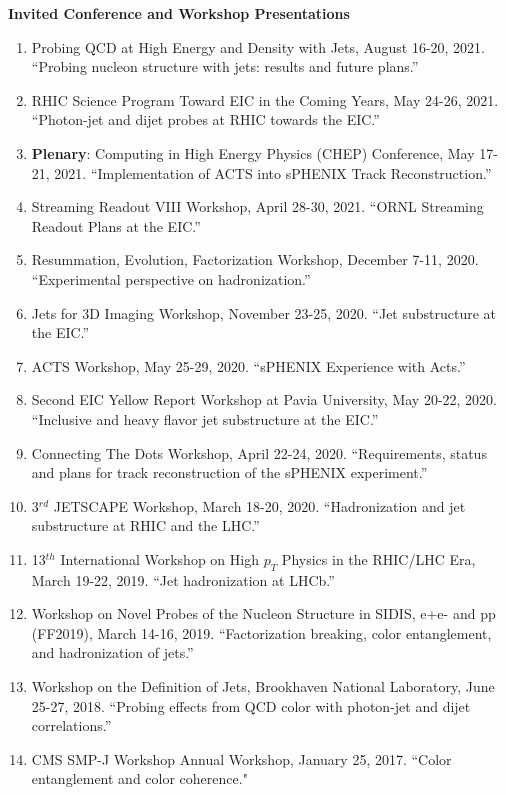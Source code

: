 \documentclass[11pt]{article}
\begin{document}
\vspace{7pt}

\begin{flushleft}
	\LARGE\textbf{Invited Conference and Workshop Presentations}
	\normalsize
	\begin{enumerate}
		\item Probing QCD at High Energy and Density with Jets, August 16-20, 2021. ``Probing nucleon structure with jets: results and future plans.''
		\item RHIC Science Program Toward EIC in the Coming Years, May 24-26, 2021. ``Photon-jet and dijet probes at RHIC towards the EIC.''
		\item {\bf{Plenary}}: Computing in High Energy Physics (CHEP) Conference, May 17-21, 2021. ``Implementation of ACTS into sPHENIX Track Reconstruction.''
		\item Streaming Readout VIII Workshop, April 28-30, 2021. ``ORNL Streaming Readout Plans at the EIC.''\\
		\item Resummation, Evolution, Factorization Workshop, December 7-11, 2020. ``Experimental perspective on hadronization.''
		\item Jets for 3D Imaging Workshop, November 23-25, 2020. ``Jet substructure at the EIC.''
		\item ACTS Workshop, May 25-29, 2020. ``sPHENIX Experience with Acts.''
		\item Second EIC Yellow Report Workshop at Pavia University, May 20-22, 2020. ``Inclusive and heavy flavor jet substructure at the EIC.''
		\item Connecting The Dots Workshop, April 22-24, 2020. ``Requirements, status and plans for track reconstruction of the sPHENIX experiment.''
		\item 3$^{rd}$ JETSCAPE Workshop, March 18-20, 2020. ``Hadronization and jet substructure at RHIC and the LHC.''
		\item 13$^{th}$ International Workshop on High $p_T$ Physics in the RHIC/LHC Era, March 19-22, 2019. ``Jet hadronization at LHCb.''
		\item Workshop on Novel Probes of the Nucleon Structure in SIDIS, e+e- and pp (FF2019), March 14-16, 2019. ``Factorization breaking, color entanglement, and hadronization of jets.''
		\item Workshop on the Definition of Jets, Brookhaven National Laboratory, June 25-27, 2018. ``Probing effects from QCD color with photon-jet and dijet correlations.''
		\item CMS SMP-J Workshop Annual Workshop, January 25, 2017. ``Color entanglement and color coherence."
	\end{enumerate}
\end{flushleft}
\end{document}

